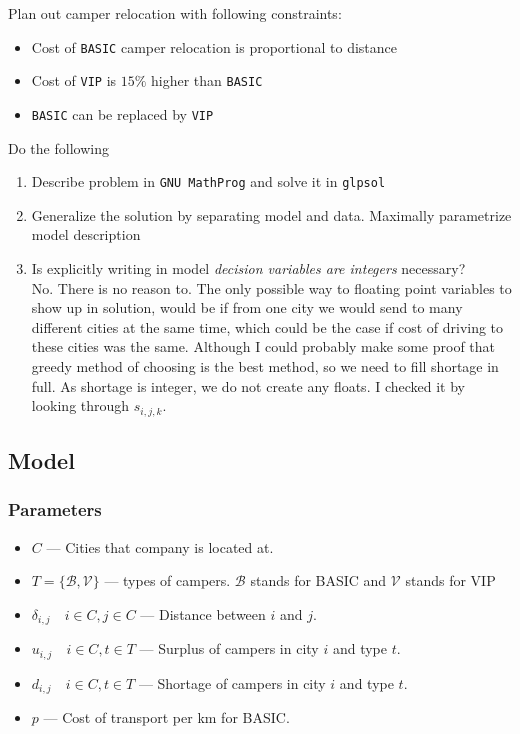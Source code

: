 Plan out camper relocation with following constraints:
\begin{itemize}
    \item Cost of \texttt{BASIC} camper relocation is proportional to distance
    \item Cost of \texttt{VIP} is $15\%$ higher than \texttt{BASIC}
    \item \texttt{BASIC} can be replaced by \texttt{VIP}
\end{itemize}
Do the following
\begin{enumerate}
    \item Describe problem in \texttt{GNU MathProg} and solve it in \texttt{glpsol} \done
    \item Generalize the solution by separating model and data. Maximally parametrize model description \done
    \item Is explicitly writing in model \textit{decision variables are integers} necessary? \done \\
    No. There is no reason to. The only possible way to floating point variables to show up in solution, would be if from one city we would send to many different cities at the same time, which could be the case if cost of driving to these cities was the same. Although I could probably make some proof that greedy method of choosing is the best method, so we need to fill shortage in full. As shortage is integer, we do not create any floats. I checked it by looking through $s_{i,j,k}$.
\end{enumerate}

\subsection{Model}
\subsubsection*{Parameters}
\begin{itemize}
    \item $C$ --- Cities that company is located at.
    \item $T = \{\mathcal{B}, \mathcal{V}\}$ --- types of campers. $\mathcal{B}$ stands for BASIC and $\mathcal{V}$ stands for VIP
    \item $\delta_{i, j} \quad i \in C, j \in C$ --- Distance between $i$ and $j$.
    \item $u_{i, j} \quad i \in C, t \in T$ --- Surplus of campers in city $i$ and type $t$. 
    \item $d_{i, j} \quad i \in C, t \in T$ --- Shortage of campers in city $i$ and type $t$.
    \item $p$ --- Cost of transport per km for BASIC.
\end{itemize}
